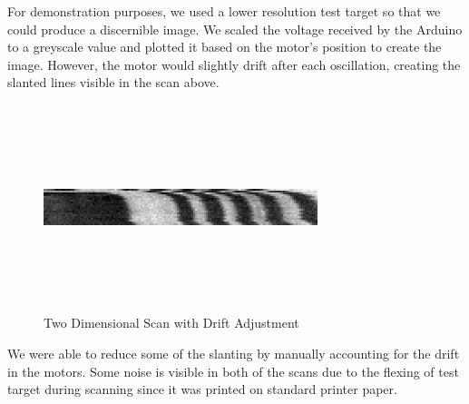 \documentclass[letterpaper, 12pt]{article}
\begin{document}
\par
For demonstration purposes, we used a lower resolution test target so that we could produce a discernible image. We scaled the voltage received by the Arduino to a greyscale value and plotted it based on the motor's position to create the image. However, the motor would slightly drift after each oscillation, creating the slanted lines visible in the scan above.

\begin{figure}[H]
  \centering
  \includegraphics[width=8cm,height=6cm]{2d_scan_2}
  \caption[caption]{Two Dimensional Scan with Drift Adjustment}
\end{figure}

\par
We were able to reduce some of the slanting by manually accounting for the drift in the motors. Some noise is visible in both of the scans due to the flexing of test target during scanning since it was printed on standard printer paper.

\newpage
\end{document}
